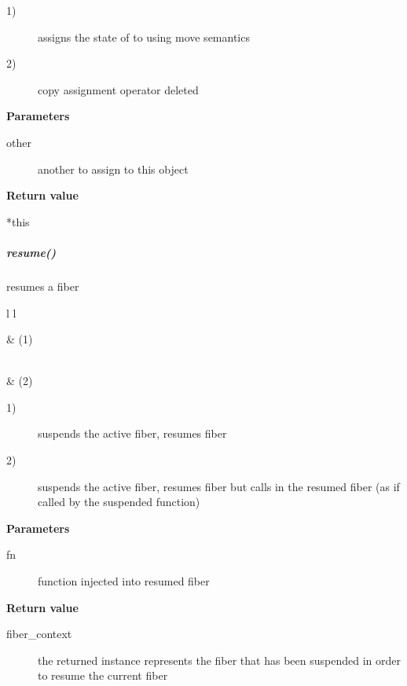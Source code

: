 \begin{description}
    \item[1)] assigns the state of  to  using move semantics
    \item[2)] copy assignment operator deleted
\end{description}

{\bfseries Parameters}
\begin{description}
    \item[other]   another \fiber to assign to this object\\
\end{description}

{\bfseries Return value}
\begin{description}
    \item[*this]
\end{description}


\subparagraph*{resume()}
resumes a fiber\\

\begin{tabular}{ l l }
    \midrule

     & (1)\\

    \midrule

    \\
     & (2)\\

    \midrule
\end{tabular}

\begin{description}
    \item[1)] suspends the active fiber, resumes fiber 
    \item[2)] suspends the active fiber, resumes fiber 
              but calls  in the resumed fiber (as if called by the
              suspended function)
\end{description}

{\bfseries Parameters}
\begin{description}
    \item[fn] function injected into resumed fiber\\
\end{description}

{\bfseries Return value}
\begin{description}
    \item[fiber\_context] the returned instance represents the fiber that has been
                 suspended in order to resume the current fiber
\end{description}

